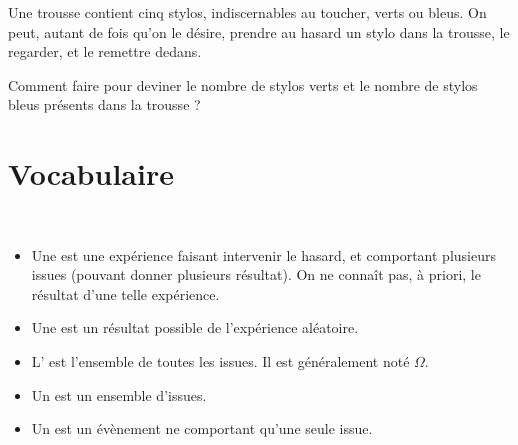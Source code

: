 \documentclass[12pt]{article}
\begin{document}
\begin{activite}
Une trousse contient cinq stylos, indiscernables au toucher, verts ou bleus. On peut, autant de fois qu'on le désire, prendre au hasard un stylo dans la trousse, le regarder, et le remettre dedans.

Comment faire pour deviner le nombre de stylos verts et le nombre de stylos bleus présents dans la trousse ?
\end{activite}

\vfill

\section{Vocabulaire}
\begin{definition}~
  \begin{itemize}
    \item Une  est une expérience faisant intervenir le hasard, et comportant plusieurs issues (pouvant donner plusieurs résultat). On ne connaît pas, à priori, le résultat d'une telle expérience.
    \item Une  est un résultat possible de l'expérience aléatoire.
    \item L' est l'ensemble de toutes les issues. Il est généralement noté $\Omega$.
    \item Un  est un ensemble d'issues.
    \item Un  est un évènement ne comportant qu'une seule issue.
  \end{itemize}
\end{definition}
\end{document}
